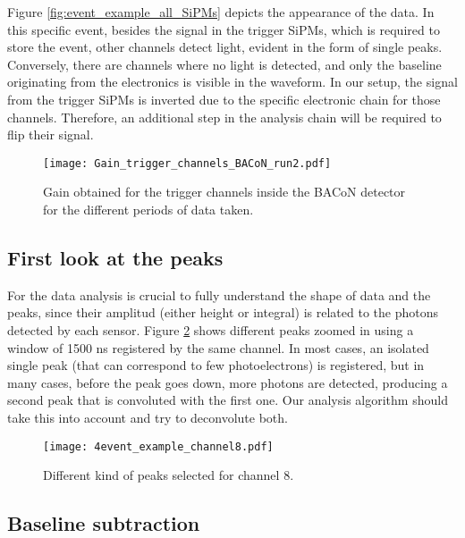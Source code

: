 \documentclass[11pt,a4paper,english,oneside, pdf]{article}
\begin{document}
	Figure \ref{fig:event_example_all_SiPMs} depicts the appearance of the data. In this specific event, besides the signal in the trigger SiPMs, which is required to store the event, other channels detect light, evident in the form of single peaks. Conversely, there are channels where no light is detected, and only the baseline originating from the electronics is visible in the waveform. In our setup, the signal from the trigger SiPMs is inverted due to the specific electronic chain for those channels. Therefore, an additional step in the analysis chain will be required to flip their signal.
	
	
	\begin{figure}[!h]
		\begin{center}
			\texttt{[image: Gain\_trigger\_channels\_BACoN\_run2.pdf]}
			\caption{Gain obtained for the trigger channels inside the BACoN detector for the different periods of data taken.}
			\label{fig:Gain_trigger_channels_BACoN_run2}
		\end{center}
	\end{figure}
	
	\subsection{First look at the peaks}
	
	For the data analysis is crucial to fully understand the shape of data and the peaks, since their amplitud (either height or integral) is related to the photons detected by each sensor. Figure \ref{fig:4event_example_channel8} shows different peaks zoomed in using a window of 1500 ns registered by the same channel. In most cases, an isolated single peak (that can correspond to few photoelectrons) is registered, but in many cases, before the peak goes down, more photons are detected, producing a second peak that is convoluted with the first one. Our analysis algorithm should take this into account and try to deconvolute both.
	
	\begin{figure}[!h]
		\begin{center}
			\texttt{[image: 4event\_example\_channel8.pdf]}
			\caption{Different kind of peaks selected for channel 8.}
			\label{fig:4event_example_channel8}
		\end{center}
	\end{figure}
	
	
	\subsection{Baseline subtraction}
	
\end{document}
